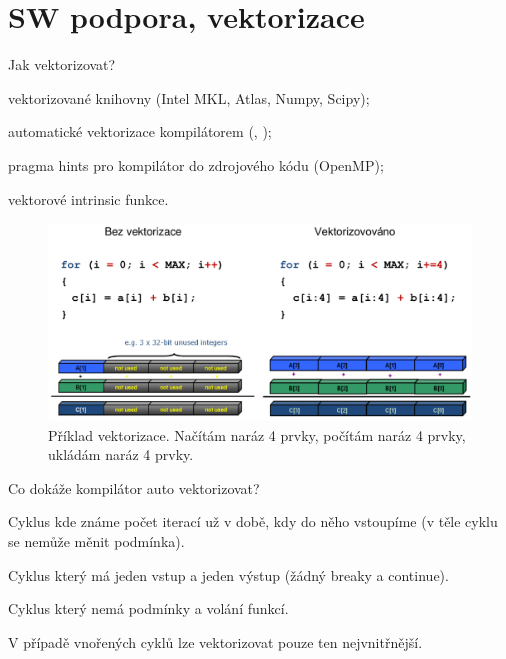 
\section{SW podpora, vektorizace}

\begin{compactitem}
    \item Jak vektorizovat? \begin{compactitem}
        \item vektorizované knihovny (Intel MKL, Atlas, Numpy, Scipy);
        \item automatické vektorizace kompilátorem (, );
        \item pragma hints pro kompilátor do zdrojového kódu (OpenMP);
        \item vektorové intrinsic funkce.
    \end{compactitem}

    \begin{figure}[H]
        \centering
        \includegraphics[width=1\linewidth]{vektorizace.pdf}
        \caption{Příklad vektorizace. Načítám naráz 4 prvky, počítám naráz 4 prvky, ukládám naráz 4 prvky.}
    \end{figure}

    \item Co dokáže kompilátor auto vektorizovat? \begin{compactitem}
        \item Cyklus kde známe počet iterací už v době, kdy do něho vstoupíme (v těle cyklu se nemůže měnit podmínka).
        \item Cyklus který má jeden vstup a jeden výstup (žádný breaky a continue).
        \item Cyklus který nemá podmínky a volání funkcí.
        \item V případě vnořených cyklů lze vektorizovat pouze ten nejvnitřnější.


\end{compactitem}
\end{compactitem}

